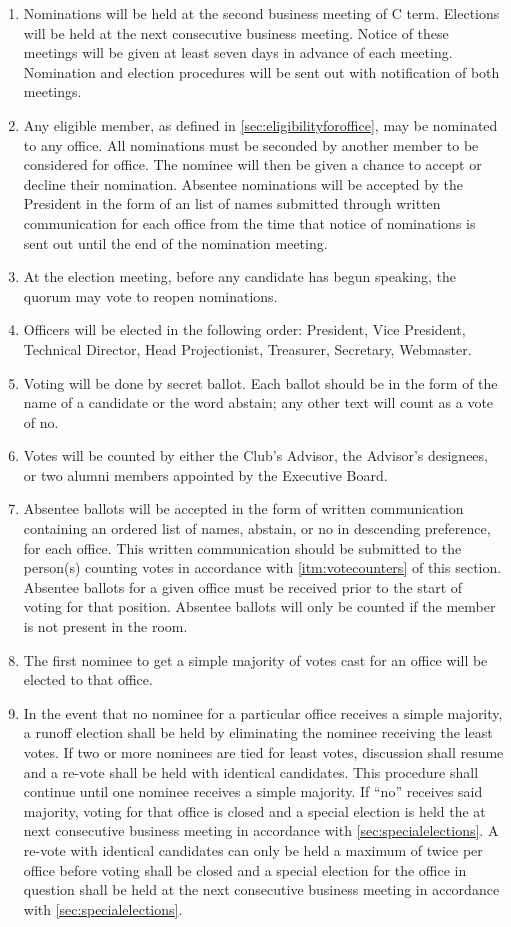 \documentclass[12pt,letterpaper]{book}
\begin{document}
\begin{enumerate}

\item Nominations will be held at the second business meeting of C term. Elections will be held at the next consecutive business meeting. Notice of these meetings will be given at least seven days in advance of each meeting. Nomination and election procedures will be sent out with notification of both meetings.
\item Any eligible member, as defined in \cref{sec:eligibilityforoffice}, may be nominated to any office. All nominations must be seconded by another member to be considered for office. The nominee will then be given a chance to accept or decline their nomination. Absentee nominations will be accepted by the President in the form of an list of names submitted through written communication for each office from the time that notice of nominations is sent out until the end of the nomination meeting.
\item At the election meeting, before any candidate has begun speaking, the quorum may vote to reopen nominations.
\item Officers will be elected in the following order: President, Vice President, Technical Director, Head Projectionist, Treasurer, Secretary, Webmaster.
\item Voting will be done by secret ballot. Each ballot should be in the form of the name of a candidate or the word abstain; any other text will count as a vote of no.
\item \label{itm:votecounters} Votes will be counted by either the Club’s Advisor, the Advisor’s designees, or two alumni members appointed by the Executive Board.
\item Absentee ballots will be accepted in the form of written communication containing an ordered list of names, abstain, or no in descending preference, for each office. This written communication should be submitted to the person(s) counting votes in accordance with \cref{itm:votecounters} of this section. Absentee ballots for a given office must be received prior to the start of voting for that position. Absentee ballots will only be counted if the member is not present in the room.
\item The first nominee to get a simple majority of votes cast for an office will be elected to that office.
\item In the event that no nominee for a particular office receives a simple majority, a runoff election shall be held by eliminating the nominee receiving the least votes. If two or more nominees are tied for least votes, discussion shall resume and a re-vote shall be held with identical candidates. This procedure shall continue until one nominee receives a simple majority. If “no” receives said majority, voting for that office is closed and a special election is held the at next consecutive business meeting in accordance with \cref{sec:specialelections}. A re-vote with identical candidates can only be held a maximum of twice per office before voting shall be closed and a special election for the office in question shall be held at the next consecutive business meeting in accordance with \cref{sec:specialelections}.

\end{enumerate}
\end{document}

